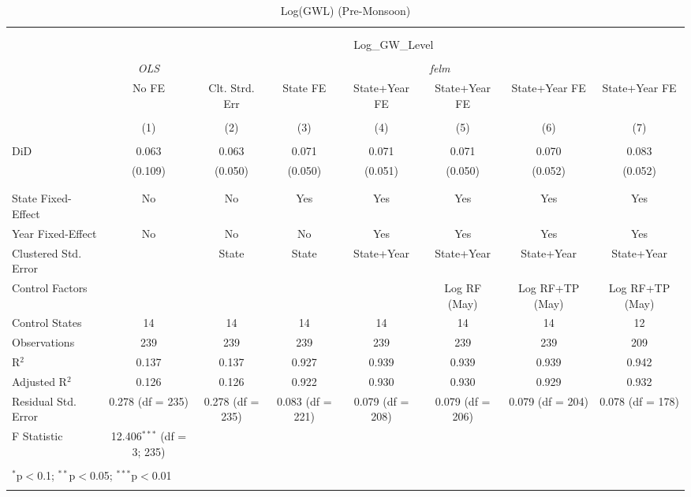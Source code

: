 
\begin{table}[!htbp] \centering 
  \caption{Log(GWL) (Pre-Monsoon)} 
  \label{} 
\begin{tabular}{@{\extracolsep{5pt}}lccccccc} 
\\[-1.8ex]\hline 
\hline \\[-1.8ex] 
\\[-1.8ex] & \multicolumn{7}{c}{Log\_GW\_Level} \\ 
\\[-1.8ex] & \textit{OLS} & \multicolumn{6}{c}{\textit{felm}} \\ 
 & No FE & Clt. Strd. Err & State FE & State+Year FE & State+Year FE & State+Year FE & State+Year FE \\ 
\\[-1.8ex] & (1) & (2) & (3) & (4) & (5) & (6) & (7)\\ 
\hline \\[-1.8ex] 
 DiD & 0.063 & 0.063 & 0.071 & 0.071 & 0.071 & 0.070 & 0.083 \\ 
  & (0.109) & (0.050) & (0.050) & (0.051) & (0.050) & (0.052) & (0.052) \\ 
  & & & & & & & \\ 
\hline \\[-1.8ex] 
State Fixed-Effect & No & No & Yes & Yes & Yes & Yes & Yes \\ 
Year Fixed-Effect & No & No & No & Yes & Yes & Yes & Yes \\ 
Clustered Std. Error &   & State & State & State+Year & State+Year & State+Year & State+Year \\ 
Control Factors &   &  &  &  & Log RF (May) & Log RF+TP (May) & Log RF+TP (May) \\ 
Control States & 14 & 14 & 14 & 14 & 14 & 14 & 12 \\ 
Observations & 239 & 239 & 239 & 239 & 239 & 239 & 209 \\ 
R$^{2}$ & 0.137 & 0.137 & 0.927 & 0.939 & 0.939 & 0.939 & 0.942 \\ 
Adjusted R$^{2}$ & 0.126 & 0.126 & 0.922 & 0.930 & 0.930 & 0.929 & 0.932 \\ 
Residual Std. Error & 0.278 (df = 235) & 0.278 (df = 235) & 0.083 (df = 221) & 0.079 (df = 208) & 0.079 (df = 206) & 0.079 (df = 204) & 0.078 (df = 178) \\ 
F Statistic & 12.406$^{***}$ (df = 3; 235) &  &  &  &  &  &  \\ 
\hline 
\hline \\[-1.8ex] 
\multicolumn{8}{l}{$^{*}$p$<$0.1; $^{**}$p$<$0.05; $^{***}$p$<$0.01} \\ 
\multicolumn{8}{l}{} \\ 
\end{tabular} 
\end{table} 
